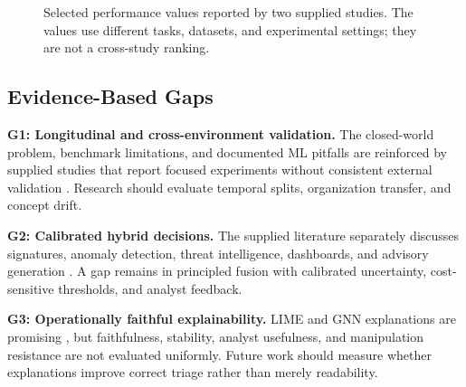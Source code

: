 \documentclass[conference]{IEEEtran}
\begin{document}
\begin{figure}[!t]
\centering
{}
\caption{Selected performance values reported by two supplied studies. The values use different tasks, datasets, and experimental settings; they are not a cross-study ranking.}
\label{fig:reportedmetrics}
\end{figure}

\subsection{Evidence-Based Gaps}
\textbf{G1: Longitudinal and cross-environment validation.} The closed-world problem, benchmark limitations, and documented ML pitfalls \cite{SommerPaxson,Tavallaee2009,Arp2022} are reinforced by supplied studies that report focused experiments without consistent external validation \cite{Rajendran2024,KumarBhatRisk,Balaji2025}. Research should evaluate temporal splits, organization transfer, and concept drift.

\textbf{G2: Calibrated hybrid decisions.} The supplied literature separately discusses signatures, anomaly detection, threat intelligence, dashboards, and advisory generation \cite{Kaufhold2022,KumarBhatRisk,KumarBhatTemporal,Abeywardena2023}. A gap remains in principled fusion with calibrated uncertainty, cost-sensitive thresholds, and analyst feedback.

\textbf{G3: Operationally faithful explainability.} LIME and GNN explanations are promising \cite{Ribeiro2016,Balaji2025}, but faithfulness, stability, analyst usefulness, and manipulation resistance are not evaluated uniformly. Future work should measure whether explanations improve correct triage rather than merely readability.
\end{document}
